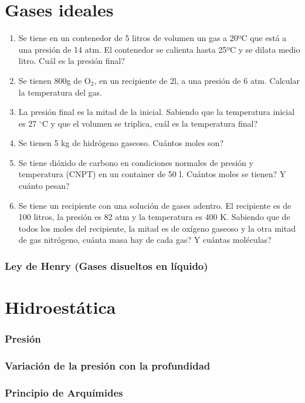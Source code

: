 \section{Gases ideales}

\begin{enumerate}
\item Se tiene en un contenedor de 5 litros de volumen un gas a 20ºC que está a una presión de 14 atm. El contenedor se calienta hasta 25ºC y se dilata medio litro. Cuál es la presión final?

\item Se tienen 800g de O$_2$, en un recipiente de 2l, a una presión de 6 atm. Calcular la temperatura del gas.

\item La presión final es la mitad de la inicial. Sabiendo que la temperatura inicial es 27 $^\circ$C y que el volumen se triplica, cuál es la temperatura final?

\item Se tienen 5 kg de hidrógeno gaseoso. Cuántos moles son?

\item Se tiene dióxido de carbono en condiciones normales de presión y temperatura (CNPT) en un container de 50 l. Cuántos moles se tienen? Y cuánto pesan?

\item Se tiene un recipiente con una solución de gases adentro. El recipiente es de 100 litros, la presión es 82 atm y la temperatura es 400 K. Sabiendo que de todos los moles del recipiente, la mitad es de oxígeno gaseoso y la otra mitad de gas nitrógeno, cuánta masa hay de cada gas? Y cuántas moléculas?
\end{enumerate}


\subsubsection*{Ley de Henry (Gases disueltos en líquido)}


\section{Hidroestática}


\subsubsection*{Presión}


\subsubsection*{Variación de la presión con la profundidad} 


\subsubsection*{Principio de Arquímides}
